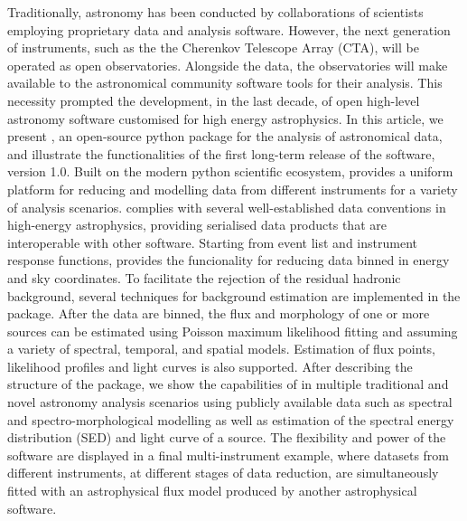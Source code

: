 \documentclass[traditabstract, longauth]{aa}
\begin{document}

\abstract
	{
		Traditionally, \gammaray astronomy has been conducted
		by collaborations of scientists employing proprietary data and analysis software.
		However, the next generation of \gammaray instruments,
		such as the the Cherenkov Telescope Array (CTA), will be operated as open observatories.
		Alongside the data, the observatories will make available to the astronomical community
		software tools for their analysis. This necessity prompted the development, in the last decade,
		of open high-level astronomy software customised for high energy astrophysics.
	}
	{
		In this article, we present \gammapy, an open-source python package for the analysis of astronomical \gammaray data,
		and illustrate the functionalities of the first long-term release of the software, version 1.0.
		Built on the modern python scientific ecosystem, \gammapy provides a uniform platform for reducing and
		modelling data from different \gammaray instruments for a variety of analysis scenarios. \gammapy complies with several well-established
		data conventions in high-energy astrophysics, providing serialised data products that are interoperable
		with other software.
	}
	{
		Starting from event list and instrument response functions,
		\gammapy provides the funcionality for reducing data binned in energy and sky coordinates.
		To facilitate the rejection of the residual hadronic background, several techniques for background estimation
		are implemented in the package.
		After the data are binned, the flux and morphology of one or more \gammaray sources can be estimated
		using Poisson maximum likelihood fitting
		and assuming a variety of spectral, temporal, and spatial models.
		Estimation of flux points, likelihood profiles and light curves is also supported.
	}
	{
		After describing the structure of the package, we show the capabilities of \gammapy
		in multiple traditional and novel \gammaray astronomy analysis scenarios using publicly available data
		such as spectral and spectro-morphological modelling as well as estimation of the spectral energy
		distribution (SED) and light curve of a source.
		The flexibility and power of the software are displayed in a final multi-instrument example,
		where datasets from different instruments, at different stages of data reduction,
		are simultaneously fitted with an astrophysical flux model produced by another astrophysical software.
	}{}


\end{document}
